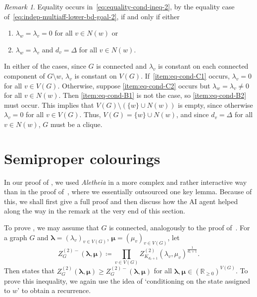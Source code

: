 \documentclass{article}
\numberwithin{equation}{section}
\theoremstyle{plain}
\theoremstyle{definition}
\theoremstyle{remark} %
\newtheorem*{remark}{Remark}
\newcommand{\defeq}{\coloneqq}
\newcommand{\RR}{\mathbb{R}}
\newcommand{\blambda}{\bm{\lambda}}
\newcommand{\bmu}{\bm{\mu}}
\newcommand{\Aletheia}{\emph{Aletheia}}
\begin{document}
\begin{remark}
    Equality occurs in~\eqref{eq:equality-cond-ineq-2}, by the equality case of~\eqref{eq:indep-multiaff-lower-bd-goal-2}, if and only if either
    \begin{enumerate}[label=(C\arabic*)]
        \item \(\lambda_w=\lambda_v=0\) for all \(v\in N(w)\) or
        \label{item:eq-cond-C1}
        \item \(\lambda_w=\lambda_v\) and \(d_v=\Delta\) for all \(v\in N(w)\).
        \label{item:eq-cond-C2}
    \end{enumerate}
    In either of the cases, since \(G\) is connected and \(\lambda_v\) is constant on each connected component of \(G \setminus w\), \(\lambda_v\) is constant on \(V(G)\).
    If~\ref{item:eq-cond-C1} occurs, \(\lambda_v=0\) for all \(v\in V(G)\).
    Otherwise, suppose \ref{item:eq-cond-C2} occurs but \(\lambda_w=\lambda_v\neq 0\) for all \(v\in N(w)\). Then \ref{item:eq-cond-B1} is not the case, so \ref{item:eq-cond-B2} must occur. This implies that \(V(G)\setminus (\{w\}\cup N(w))\) is empty, since otherwise \(\lambda_v=0\) for all \(v\in V(G)\). Thus, \(V(G) = \{w\}\cup N(w)\), and since \(d_v=\Delta\) for all \(v\in N(w)\), \(G\) must be a clique.
\end{remark}



\section{Semiproper colourings}\label{sec:semiproper}
In our proof of , we used {\Aletheia} in a more complex and rather interactive way than in the proof of~, where we essentially outsourced one key lemma. Because of this, we shall first give a full proof and then discuss how the AI agent helped along the way in the remark at the very end of this section.

To prove , we may assume that \(G\) is connected, analogously to the proof of~. For a graph \(G\) and \(\blambda=(\lambda_v)_{v\in V(G)}\), \(\bmu=(\mu_v)_{v\in V(G)}\), let
\[
    Z_G^{(2)-}(\blambda,\bmu) \defeq \prod_{v\in V(G)} Z^{(2)}_{K_{d_v+1}}(\lambda_v,\mu_v)^{\frac{1}{d_v+1}}.
\]
Then  states that \(Z^{(2)}_G(\blambda,\bmu)\ge Z_G^{(2)-}(\blambda,\bmu)\) for all \(\blambda,\bmu\in (\RR_{\ge0})^{V(G)}\). To prove this inequality, we again use the idea of `conditioning on the state assigned to \(w\)' to obtain a recurrence. 
\end{document}
